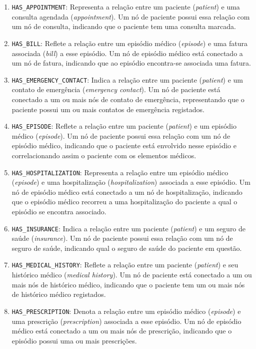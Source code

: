 \begin{enumerate}
    \item \texttt{HAS\_APPOINTMENT}: Representa a relação entre um paciente (\textit{patient}) e uma consulta agendada (\textit{appointment}). Um nó de paciente possui essa relação com um nó de consulta, indicando que o paciente tem uma consulta marcada.
    \item  \texttt{HAS\_BILL}: Reflete a relação entre um episódio médico (\textit{episode}) e uma fatura associada (\textit{bill}) a esse episódio. Um nó de episódio médico está conectado a um nó de fatura, indicando que ao episódio encontra-se associada uma fatura.
    \item  \texttt{HAS\_EMERGENCY\_CONTACT}: Indica a relação entre um paciente (\textit{patient}) e um contato de emergência (\textit{emergency contact}). Um nó de paciente está conectado a um ou mais nós de contato de emergência, representando que o paciente possui um ou mais contatos de emergência registados.
    \item  \texttt{HAS\_EPISODE}: Reflete a relação entre um paciente (\textit{patient}) e um episódio médico (\textit{episode}). Um nó de paciente possui essa relação com um nó de episódio médico, indicando que o paciente está envolvido nesse episódio e correlacionando assim o paciente com os elementos médicos.
    \item  \texttt{HAS\_HOSPITALIZATION}: Representa a relação entre um episódio médico (\textit{episode}) e uma hospitalização (\textit{hospitalization}) associada a esse episódio. Um nó de episódio médico está conectado a um nó de hospitalização, indicando que o episódio médico recorreu a uma hospitalização do paciente a qual o episódio se encontra associado.
    \item  \texttt{HAS\_INSURANCE}: Indica a relação entre um paciente (\textit{patient}) e um seguro de saúde (\textit{insurance}). Um nó de paciente possui essa relação com um nó de seguro de saúde, indicando qual o seguro de saúde do paciente em questão.
    \item  \texttt{HAS\_MEDICAL\_HISTORY}: Reflete a relação entre um paciente (\textit{patient}) e seu histórico médico (\textit{medical history}). Um nó de paciente está conectado a um ou mais nós de histórico médico, indicando que o paciente tem um ou mais nós de histórico médico registados.
    \item  \texttt{HAS\_PRESCRIPTION}: Denota a relação entre um episódio médico (\textit{episode}) e uma prescrição (\textit{prescription}) associada a esse episódio. Um nó de episódio médico está conectado a um ou mais nós de prescrição, indicando que o episódio possui uma ou mais prescrições.

\end{enumerate}

